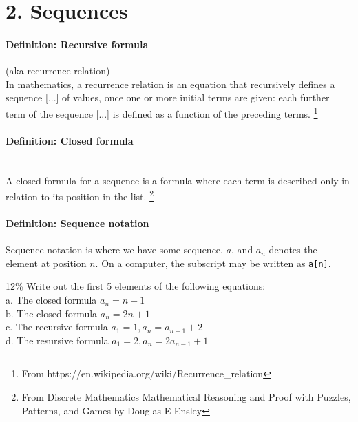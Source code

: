 \documentclass[a4paper,12pt]{book}
\begin{document}
    \section*{2. Sequences}
        \begin{introNOHEAD}{}
            \paragraph{Definition: Recursive formula} (aka recurrence relation) \\
            In mathematics, a recurrence relation is an equation that recursively defines
            a sequence [...] of values, once one or more initial terms are given:
            each further term of the sequence [...] is defined as a function
            of the preceding terms.
            \footnote{From https://en.wikipedia.org/wiki/Recurrence\_relation}

            \paragraph{Definition: Closed formula} ~\\
            A closed formula for a sequence is a formula where each term is described
            only in relation to its position in the list.
            \footnote{From Discrete Mathematics Mathematical Reasoning and Proof with Puzzles, Patterns, and Games by Douglas E Ensley}

            \paragraph{Definition: Sequence notation}
            Sequence notation is where we have some sequence, $a$,
            and $a_{n}$ denotes the element at position $n$. On a computer,
            the subscript may be written as \texttt{a[n]}.
        \end{introNOHEAD}

        

        \begin{question}{2}{12\%}
            Write out the first 5 elements of the following equations: \\
            \tab a. The closed formula $a_{n} = n+1$ \\
            \tab b. The closed formula $a_{n} = 2n+1$ \\
            \tab c. The recursive formula $a_{1} = 1, a_{n} = a_{n-1} + 2$ \\
            \tab d. The resursive formula $a_{1} = 2, a_{n} = 2 a_{n-1} + 1$
        \end{question}
\end{document}
